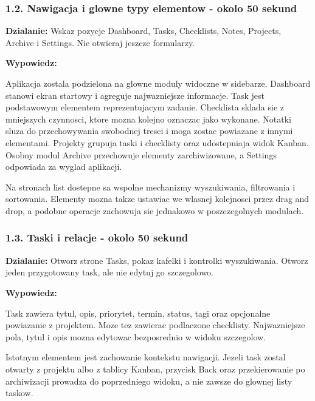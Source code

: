 \documentclass[
  polish,
  12pt,
  a4paper,
]{article}
\renewenvironment{quote}
  {\list{}{\leftmargin=1.2em\rightmargin=0.6em}%
   \item\relax\color{black}\setlength{\parskip}{0.7em}}
  {\endlist}
\begin{document}
\subsubsection{1.2. Nawigacja i glowne typy elementow - okolo 50
sekund}\label{12-nawigacja-i-glowne-typy-elementow---okolo-50-sekund}

\textbf{Dzialanie:} Wskaz pozycje Dashboard, Tasks, Checklists, Notes,
Projects, Archive i Settings. Nie otwieraj jeszcze formularzy.

\textbf{Wypowiedz:}

\begin{quote}
Aplikacja zostala podzielona na glowne moduly widoczne w sidebarze.
Dashboard stanowi ekran startowy i agreguje najwazniejsze informacje.
Task jest podstawowym elementem reprezentujacym zadanie. Checklista
sklada sie z mniejszych czynnosci, ktore mozna kolejno oznaczac jako
wykonane. Notatki sluza do przechowywania swobodnej tresci i moga zostac
powiazane z innymi elementami. Projekty grupuja taski i checklisty oraz
udostepniaja widok Kanban. Osobny modul Archive przechowuje elementy
zarchiwizowane, a Settings odpowiada za wyglad aplikacji.

Na stronach list dostepne sa wspolne mechanizmy wyszukiwania,
filtrowania i sortowania. Elementy mozna takze ustawiac we wlasnej
kolejnosci przez drag and drop, a podobne operacje zachowuja sie
jednakowo w poszczegolnych modulach.
\end{quote}

\subsubsection{1.3. Taski i relacje - okolo 50
sekund}\label{13-taski-i-relacje---okolo-50-sekund}

\textbf{Dzialanie:} Otworz strone Tasks, pokaz kafelki i kontrolki
wyszukiwania. Otworz jeden przygotowany task, ale nie edytuj go
szczegolowo.

\textbf{Wypowiedz:}

\begin{quote}
Task zawiera tytul, opis, priorytet, termin, status, tagi oraz
opcjonalne powiazanie z projektem. Moze tez zawierac podlaczone
checklisty. Najwazniejsze pola, tytul i opis mozna edytowac bezposrednio
w widoku szczegolow.

Istotnym elementem jest zachowanie kontekstu nawigacji. Jezeli task
zostal otwarty z projektu albo z tablicy Kanban, przycisk Back oraz
przekierowanie po archiwizacji prowadza do poprzedniego widoku, a nie
zawsze do glownej listy taskow.
\end{quote}
\end{document}
